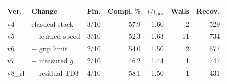 \begin{tabular}{@{}llrrrrr@{}}
\toprule
Ver. & Change & Fin. & Compl.\,\% & $t/t_{\mathrm{pro}}$ & Walls & Recov. \\
\midrule
v4 & classical stack & 3/10 & 57.9 & 1.60 & 2 & 529 \\
v5 & + learned speed & 3/10 & 52.3 & 1.63 & 11 & 734 \\
v6 & + grip limit & 2/10 & 54.0 & 1.50 & 2 & 677 \\
v7 & + measured $g$ & 2/10 & 46.2 & 1.44 & 1 & 747 \\
v8\_rl & + residual TD3 & 4/10 & 58.1 & 1.50 & 1 & 431 \\
\bottomrule
\end{tabular}
